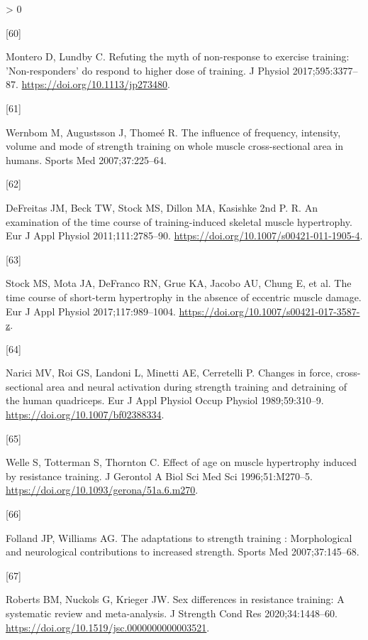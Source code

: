 \documentclass[twoside,10pt]{gihclass} %
\newlength{\cslhangindent}
\newlength{\csllabelwidth}
\newenvironment{CSLReferences}[3] %
 {%
  \setlength{\parindent}{0pt}
  \ifodd #1 \everypar{\setlength{\hangindent}{\cslhangindent}}\ignorespaces\fi
  \ifnum #2 > 0
  \setlength{\parskip}{#2\baselineskip}
  \fi
 }%
 {}
\newcommand{\CSLLeftMargin}[1]{\parbox[t]{\maxof{\widthof{#1}}{\csllabelwidth}}{#1}}
\newcommand{\CSLRightInline}[1]{\parbox[t]{\linewidth}{#1}}
\begin{document}
\begin{CSLReferences}{0}{0}
\leavevmode\hypertarget{ref-RN2699}{}%
\CSLLeftMargin{{[}60{]} }
\CSLRightInline{Montero D, Lundby C. Refuting the myth of non-response to exercise training: 'Non-responders' do respond to higher dose of training. J Physiol 2017;595:3377--87. \url{https://doi.org/10.1113/jp273480}.}

\leavevmode\hypertarget{ref-RN346}{}%
\CSLLeftMargin{{[}61{]} }
\CSLRightInline{Wernbom M, Augustsson J, Thomeé R. The influence of frequency, intensity, volume and mode of strength training on whole muscle cross-sectional area in humans. Sports Med 2007;37:225--64.}

\leavevmode\hypertarget{ref-RN1596}{}%
\CSLLeftMargin{{[}62{]} }
\CSLRightInline{DeFreitas JM, Beck TW, Stock MS, Dillon MA, Kasishke 2nd P. R. An examination of the time course of training-induced skeletal muscle hypertrophy. Eur J Appl Physiol 2011;111:2785--90. \url{https://doi.org/10.1007/s00421-011-1905-4}.}

\leavevmode\hypertarget{ref-RN2113}{}%
\CSLLeftMargin{{[}63{]} }
\CSLRightInline{Stock MS, Mota JA, DeFranco RN, Grue KA, Jacobo AU, Chung E, et al. The time course of short-term hypertrophy in the absence of eccentric muscle damage. Eur J Appl Physiol 2017;117:989--1004. \url{https://doi.org/10.1007/s00421-017-3587-z}.}

\leavevmode\hypertarget{ref-RN2736}{}%
\CSLLeftMargin{{[}64{]} }
\CSLRightInline{Narici MV, Roi GS, Landoni L, Minetti AE, Cerretelli P. Changes in force, cross-sectional area and neural activation during strength training and detraining of the human quadriceps. Eur J Appl Physiol Occup Physiol 1989;59:310--9. \url{https://doi.org/10.1007/bf02388334}.}

\leavevmode\hypertarget{ref-RN2739}{}%
\CSLLeftMargin{{[}65{]} }
\CSLRightInline{Welle S, Totterman S, Thornton C. Effect of age on muscle hypertrophy induced by resistance training. J Gerontol A Biol Sci Med Sci 1996;51:M270--5. \url{https://doi.org/10.1093/gerona/51a.6.m270}.}

\leavevmode\hypertarget{ref-RN767}{}%
\CSLLeftMargin{{[}66{]} }
\CSLRightInline{Folland JP, Williams AG. The adaptations to strength training : Morphological and neurological contributions to increased strength. Sports Med 2007;37:145--68.}

\leavevmode\hypertarget{ref-RN2740}{}%
\CSLLeftMargin{{[}67{]} }
\CSLRightInline{Roberts BM, Nuckols G, Krieger JW. Sex differences in resistance training: A systematic review and meta-analysis. J Strength Cond Res 2020;34:1448--60. \url{https://doi.org/10.1519/jsc.0000000000003521}.}


\end{CSLReferences}
\end{document}
